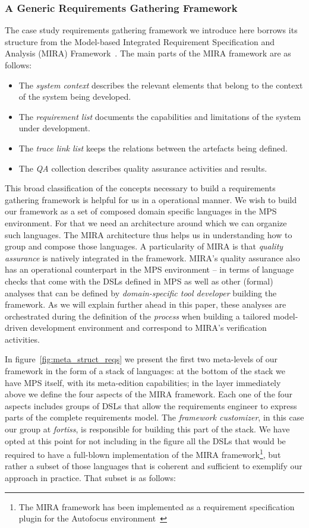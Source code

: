 \subsubsection{A Generic Requirements Gathering Framework}
\label{sec:generic_req_fram}

The case study requirements gathering framework we introduce here borrows its
structure from the Model-based Integrated Requirement Specification and Analysis (MIRA)
Framework~\cite{MIRA13}. The main parts of the MIRA framework are
as follows:
\begin{itemize}
  \item The \emph{system context} describes the relevant elements that belong
  to the context of the system being developed.
  \item The \emph{requirement list} documents the capabilities and limitations
  of the system under development.
  \item The \emph{trace link list} keeps the relations between the artefacts
  being defined.
  \item The \emph{QA} collection describes quality assurance activities and
  results.
\end{itemize}

This broad classification of the concepts necessary to build a requirements
gathering framework is helpful for us in a operational manner. We wish to build
our framework as a set of composed domain specific languages in the MPS
environment. For that we need an architecture around which we can organize such
languages. The MIRA architecture thus helps us in understanding how to group and
compose those languages. A particularity of MIRA is that \emph{quality
assurance} is natively integrated in the framework. MIRA's quality assurance
also has an operational counterpart in the MPS environment -- in terms of
language checks that come with the DSLs defined in MPS as well as other (formal)
analyses that can be defined by \emph{domain-specific tool developer} building
the framework. As we will explain further ahead in this paper, these analyses
are orchestrated during the definition of the \emph{process} when building a
tailored model-driven development environment and correspond to MIRA's verification activities.

In figure~\ref{fig:meta_struct_reqs} we present the first two meta-levels of our
framework in the form of a stack of languages: at the bottom of the stack we
have MPS itself, with its meta-edition capabilities; in the layer immediately
above we define the four aspects of the MIRA framework. Each one of the four
aspects includes groups of DSLs that allow the requirements engineer to express
parts of the complete requirements model. The \emph{framework customizer}, in
this case our group at \emph{fortiss}, is responsible for building this part of
the stack. We have opted at this point for not including in the figure all the
DSLs that would be required to have a full-blown implementation of the MIRA
framework\footnote{The MIRA framework has been implemented as a requirement
specification plugin for the Autofocus environment~\cite{AF315}}, but rather a
subset of those languages that is coherent and sufficient to exemplify our
approach in practice. That subset is as follows:

